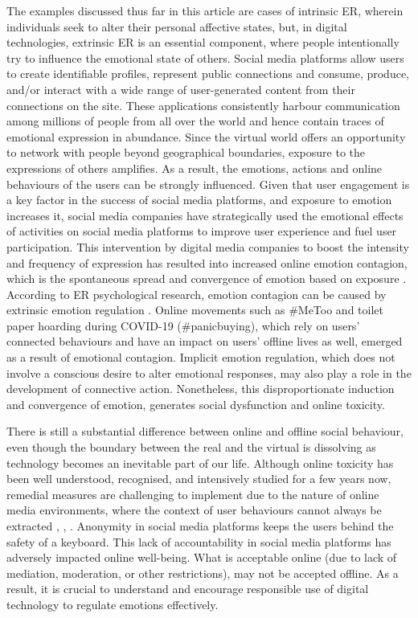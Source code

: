 \documentclass[lettersize,journal]{IEEEtran}
\begin{document}
  
The examples discussed thus far in this article are cases of intrinsic ER, wherein individuals seek to alter their personal affective states, but, in digital technologies, extrinsic ER is an essential component, where people intentionally try to influence the emotional state of others. Social media platforms allow users to create identifiable profiles, represent public connections and consume, produce, and/or interact with a wide range of user-generated content from their connections on the site. These applications consistently harbour communication among millions of people from all over the world and hence contain traces of emotional expression in abundance. Since the virtual world offers an opportunity to network with people beyond geographical boundaries, exposure to the expressions of others amplifies. As a result, the emotions, actions and online behaviours of the users can be strongly influenced. Given that user engagement is a key factor in the success of social media platforms, and exposure to emotion increases it, social media companies have strategically used the emotional effects of activities on social media platforms to improve user experience and fuel user participation. This intervention by digital media companies to boost the intensity and frequency of expression has resulted into increased online emotion contagion, which is the spontaneous spread and convergence of emotion based on exposure \cite{goldenberg2020digital}. According to ER psychological research, emotion contagion can be caused by extrinsic emotion regulation \cite{elfenbein2014many}. Online movements such as \#MeToo and toilet paper hoarding during COVID-19 (\#panicbuying), which rely on users' connected behaviours and have an impact on users' offline lives as well, emerged as a result of emotional contagion. Implicit emotion regulation, which does not involve a conscious desire to alter emotional responses, may also play a role in the development of connective action. Nonetheless, this disproportionate induction and convergence of emotion, generates social dysfunction and online toxicity.


There is still a substantial difference between online and offline social behaviour, even though the boundary between the real and the virtual is dissolving as technology becomes an inevitable part of our life. Although online toxicity has been well understood, recognised, and intensively studied for a few years now, remedial measures are challenging to implement due to the nature of online media environments, where the context of user behaviours cannot always be extracted \cite{slovak2022designing}, \cite{tag2022emotion}, \cite{thomas2022s}. Anonymity in social media platforms keeps the users behind the safety of a keyboard. This lack of accountability in social media platforms has adversely impacted online well-being. What is acceptable online (due to lack of mediation, moderation, or other restrictions), may not be accepted offline. As a result, it is crucial to understand and encourage responsible use of digital technology to regulate emotions effectively.
\end{document}
